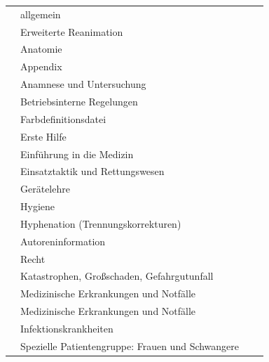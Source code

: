 \documentclass[
ngerman,
paper=a4,
asymmetric,
fontsize=10pt,
draft=false,
numbers=noenddot,
bibtotocnumbered,
footnotes=multiple,
toc=flat,
]{scrbook}
\begin{document}
\begin{tabulary}{\linewidth}{cLlL}\toprule
\noindent{} 
& 
\noindent{} 
& 
\noindent{}
& 
\noindent{}
\\\midrule
{} &  \noindent\AASS{} allgemein  & & 
\\\addlinespace
{} & Erweiterte Reanimation &  &
\\\addlinespace
{} & Anatomie &  &
\\\addlinespace
{} & Appendix &  \caps{---} &
\\\addlinespace
{} & Anamnese und Untersuchung &   &
\\\addlinespace
{} & Betriebsinterne Regelungen &  \caps{---} &
\\\addlinespace
{} &  Farbdefinitionsdatei &  \caps{---} &
\\\addlinespace
{} & Erste Hilfe &   &
\\\addlinespace
{} & Einführung in die Medizin &   &
\\\addlinespace
{} & Einsatztaktik und Rettungswesen &  &
\\\addlinespace
{} & Gerätelehre &   &
\\\addlinespace
{} & Hygiene &   &
\\\addlinespace
{} &  Hyphenation (Trennungskorrekturen) &  \caps{---} &
\\\addlinespace
{} & Autoreninformation &   &
\\\addlinespace
{}  & Recht &   &
\\\addlinespace
{} & Katastrophen, Großschaden, Gefahrgutunfall & 
 & 
\\\addlinespace
{} & Medizinische Erkrankungen und Notfälle & 
 & 
\\\addlinespace
{} & Medizinische Erkrankungen und Notfälle & 
 & 
\\\addlinespace
{} & Infektionskrankheiten & 
 & 
\\\addlinespace
{} & Spezielle Patientengruppe: Frauen und Schwangere & 

\end{tabulary}
\end{document}
